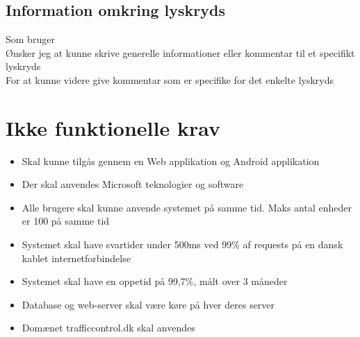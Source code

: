 	\subsection*{Information omkring lyskryds}
	Som bruger\\
	Ønsker jeg at kunne skrive generelle informationer eller kommentar til et specifikt lyskryds\\
	For at kunne videre give kommentar som er specifike for det enkelte lyskryds

	\section{Ikke funktionelle krav}
	\begin{itemize}[-]
		\itemsep 0.3em 
		\item Skal kunne tilgås gennem en Web applikation og Android applikation
		\item Der skal anvendes Microsoft teknologier og software
		\item Alle brugere skal kunne anvende systemet på samme tid. Maks antal enheder er 100 på samme tid
		\item Systemet skal have svartider under 500ms ved 99\% af requests på en dansk kablet internetforbindelse
		\item Systemet skal have en oppetid på 99,7\%, målt over 3 måneder
		\item Database og web-server skal være køre på hver deres server
		\item Domænet trafficcontrol.dk skal anvendes
	\end{itemize}
	